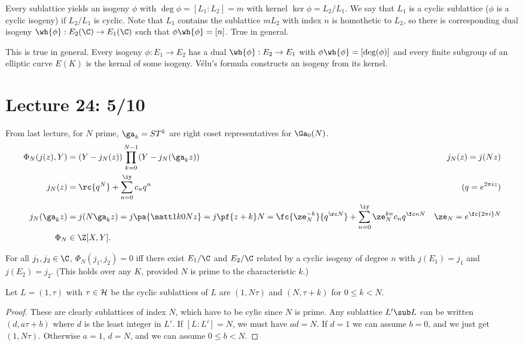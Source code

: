 Every sublattice yields an isogeny $\phi$ with $\deg\phi=[L_1:L_2]=m$ with kernel $\ker \phi=L_2/L_1$. We say that $L_1$ is a cyclic sublattice ($\phi$ is a cyclic isogeny) if $L_2/L_1$ is cyclic. Note that $L_1$ contains the sublattice $mL_2$ with index $n$ is homothetic to $L_2$, so there is corresponding dual isogeny $\wh{\phi}:E_2(\C)\to E_1(\C)$ such that $\phi\wh{\phi}=[n]$. True in general.

This is true in general. Every isogeny $\phi:E_1\to E_2$ has a dual $\wh{\phi}:E_2\to E_1$ with $\phi\wh{\phi}=[\deg(\phi)]$ and every finite subgroup of an elliptic curve $E(K)$ is the kernal of some isogeny. 
V\'elu's formula constructs an isogeny from its kernel.
\section{Lecture 24: 5/10}
From last lecture, for $N$ prime, $\ga_k=ST^k$ are right coset representatives for $\Ga_0(N)$.
\begin{align*}
\Phi_N(j(z),Y)&=(Y-j_N(z))\prod_{k=0}^{N-1} (Y-j_N(\ga_k z))&j_N(z)=j(Nz)\\
j_N(z)&=\rc{q^N} +\sum_{n=0}^{\iy} c_nq^n& (q=e^{2\pi iz})\\
j_N(\ga_kz)&=j(N\ga_k z)=j\pa{\matt 1k0Nz}=j\pf{z+k}N =\fc{\ze_N^{-k}}{q^{\rc N}}+\sum_{n=0}^{\iy} \ze_N^{kn} c_nq^{\fc nN}&\ze_N=e^{\fc{2\pi i }N}\\
\Phi_N&\in \Z[X,Y].
\end{align*}
\begin{thm}
For all $j_1,j_2\in \C$, $\Phi_N(j_1,j_2)=0$ iff there exist $E_1/\C$ and $E_2/\C$ related by a cyclic isogeny of degree $n$ with $j(E_1)=j_1$ and $j(E_2)=j_2$. (This holds over any $K$, provided $N$ is prime to the characteristic $k$.)
\end{thm}
\begin{lem}
Let $L=(1,\tau)$ with $\tau\in \cal H$ be the cyclic sublattices of $L$ are $(1,N\tau)$ and $(N,\tau+k)$ for $0\le k< N$.
\end{lem}
\begin{proof}
These are clearly sublattices of index $N$, which have to be cylic since $N$ is prime. Any sublattice $L'\sub L$ can be written $(d,a\tau+b)$ where $d$ is the least integer in $L'$. If $[L:L']=N$, we must have $ad=N$. If $d=1$ we can assume $b=0$, and we just get $(1,N\tau)$. Otherwise $a=1$, $d=N$, and we can assume $0\le b<N$.
\end{proof}
